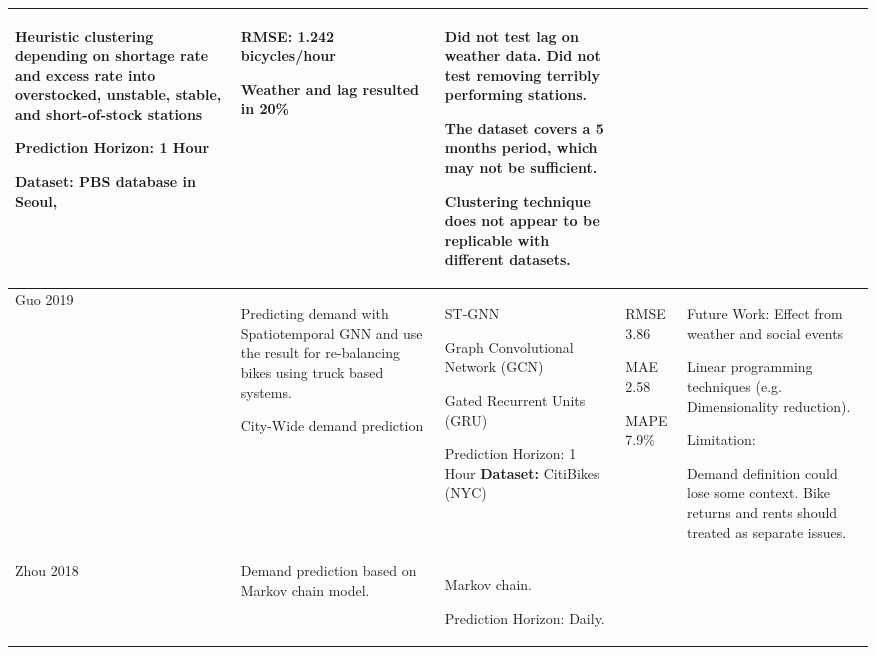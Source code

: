 \documentclass{article}
\begin{document}
\begin{center}
\begin{longtable}{ | m{4em} | m{14em} | m{14em} | m{13em} | m{17em} |}
    Heuristic clustering depending on shortage rate and excess rate into overstocked, unstable, stable, and short-of-stock stations
    
    Prediction Horizon: 1 Hour

    \textbf{Dataset:}  PBS database in Seoul,
    &

    RMSE: 1.242 bicycles/hour

    Weather and lag resulted in 20\% &
      \newline
    Did not test lag on weather data. Did not test removing terribly performing stations.
    
    The dataset covers a 5 months period, which may not be sufficient.
    
    Clustering technique does not appear to be replicable with different datasets.\newline
    
    \\
       
   \hline    

    Guo 2019 &\cite{guo2019} Predicting demand with Spatiotemporal GNN and use the result for re-balancing bikes using truck based systems. 
    
    City-Wide demand prediction
    & ST-GNN
    
    Graph Convolutional Network (GCN)
    
    Gated Recurrent Units (GRU)

    Prediction Horizon: 1 Hour
    \textbf{Dataset:} CitiBikes (NYC)
    &

    RMSE 3.86

    MAE 2.58
    
    MAPE 7.9\% 
    
    &
      \newline
    Future Work: 
    Effect from weather and social events
    
    Linear programming techniques (e.g. Dimensionality reduction).

    Limitation: 
    
    Demand definition could lose some context. Bike returns and rents should treated as separate issues.
\newline
    
    \\
       
   \hline   
    Zhou 2018 &\cite{Zhou2018} Demand prediction based on Markov chain model. &
    Markov chain.

    Prediction Horizon: Daily.


\end{longtable}
\end{center}
\end{document}
